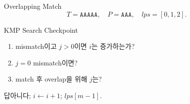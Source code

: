 \begin{frame}{Overlapping Match}
\[
T=\texttt{AAAAA},\quad P=\texttt{AAA},\quad lps=[0,1,2].
\]
\centering{}
\end{frame}
\begin{frame}{KMP Search Checkpoint}
\begin{enumerate}\item mismatch이고 \(j>0\)이면 \(i\)는 증가하는가?\item \(j=0\) mismatch이면?\item match 후 overlap을 위해 \(j\)는?\end{enumerate}
\begin{exampleblock}{답}아니다; \(i\gets i+1\); \(lps[m-1]\).\end{exampleblock}
\end{frame}
